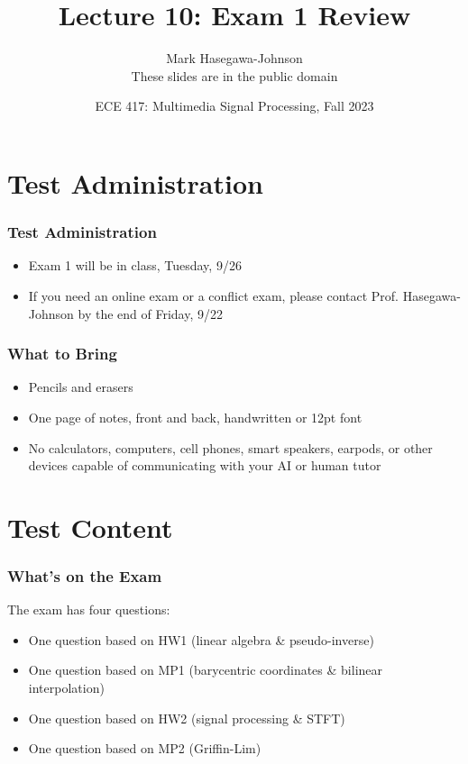 \documentclass{beamer}
\title{Lecture 10: Exam 1 Review}
\author{Mark Hasegawa-Johnson\\These slides are in the public domain}
\date{ECE 417: Multimedia Signal Processing, Fall 2023}
\begin{document}
\begin{frame}
  \maketitle
\end{frame}

\begin{frame}
  \tableofcontents
\end{frame}


\section[Admin]{Test Administration}
\setcounter{subsection}{1}

\begin{frame}
  \frametitle{Test Administration}

  \begin{itemize}
  \item Exam 1 will be in class, Tuesday, 9/26
  \item If you need an online exam or a conflict exam, please contact
    Prof. Hasegawa-Johnson by the end of Friday, 9/22
  \end{itemize}
\end{frame}
  
\begin{frame}
  \frametitle{What to Bring}

  \begin{itemize}
  \item Pencils and erasers
  \item One page of notes, front and back, handwritten or 12pt font
  \item No calculators, computers, cell phones, smart speakers,
    earpods, or other devices capable of communicating with your AI
    or human tutor
  \end{itemize}
\end{frame}
  
\section[Content]{Test Content}
\setcounter{subsection}{1}

\begin{frame}
  \frametitle{What's on the Exam}

  The exam has four questions:
  \begin{itemize}
  \item One question based on HW1 (linear algebra \& pseudo-inverse)
  \item One question based on MP1 (barycentric coordinates \& bilinear interpolation)
  \item One question based on HW2 (signal processing \& STFT)
  \item One question based on MP2 (Griffin-Lim)
  \end{itemize}
\end{frame}
\end{document}

